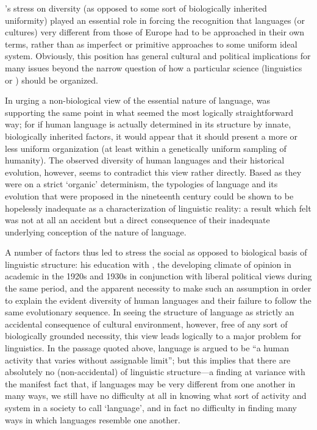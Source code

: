 {\Boas}'s {stress} on diversity (as opposed to some sort of biologically
inherited uniformity) played an essential role in forcing the
recognition that languages (or cultures) very different from those of
Europe had to be approached in their own terms, rather than as
imperfect or primitive approaches to some uniform ideal
system. Obviously, this position has general cultural and political
implications for many issues beyond the narrow question of how a
particular science (linguistics or ) should be
organized.

In urging a non-biological view of the essential nature of language,
{\Sapir} was supporting the same point in what seemed the most logically
straightforward way; for if human language is actually determined in
its structure by innate, biologically inherited factors, it would
appear that it should present a more or less uniform organization (at
least within a genetically uniform sampling of humanity). The observed
diversity of human languages and their historical evolution, however,
seems to contradict this view rather directly. Based as they were on a
strict `organic' determinism, the typologies of language and its
evolution that were proposed in the nineteenth century could be shown
to be hopelessly inadequate as a characterization of linguistic
reality: a result which {\Sapir} felt was not at all an accident but a
direct consequence of their inadequate underlying conception of the
nature of language.

A number of factors thus led {\Sapir} to {stress} the social as opposed to
biological basis of linguistic structure: his education with {\Boas}, the
developing climate of opinion in academic  in the 1920s
and 1930s in conjunction with liberal political views during the same
period, and the apparent necessity to make such an assumption in order
to explain the evident diversity of human languages and their failure
to follow the same evolutionary sequence. In seeing the structure of
language as strictly an accidental consequence of cultural
environment, however, free of any sort of biologically grounded
necessity, this view leads logically to a major problem for
linguistics. In the passage quoted above, language is argued to be ``a
human activity that varies without assignable limit''; but this implies
that there are absolutely no (non-accidental)  of linguistic
structure—a finding at variance with the manifest fact that, if
languages may be very different from one another in many ways, we
still have no difficulty at all in knowing what sort of activity and
system in a society to call `language', and in fact no difficulty in
finding many ways in which languages resemble one another.

